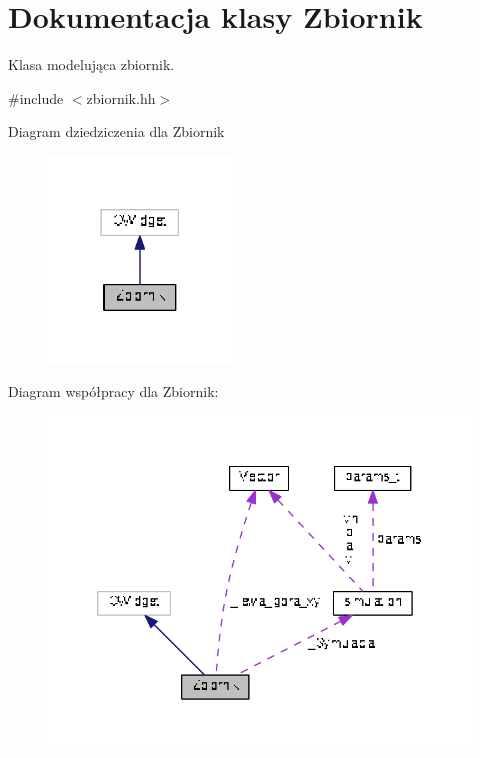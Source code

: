 \hypertarget{class_zbiornik}{}\section{Dokumentacja klasy Zbiornik}
\label{class_zbiornik}


Klasa modelująca zbiornik.  




{\ttfamily \#include $<$zbiornik.\+hh$>$}



Diagram dziedziczenia dla Zbiornik\nopagebreak
\begin{figure}[H]
\begin{center}
\leavevmode
\includegraphics[width=138pt]{class_zbiornik__inherit__graph}
\end{center}
\end{figure}


Diagram współpracy dla Zbiornik\+:\nopagebreak
\begin{figure}[H]
\begin{center}
\leavevmode
\includegraphics[width=339pt]{class_zbiornik__coll__graph}
\end{center}
\end{figure}
